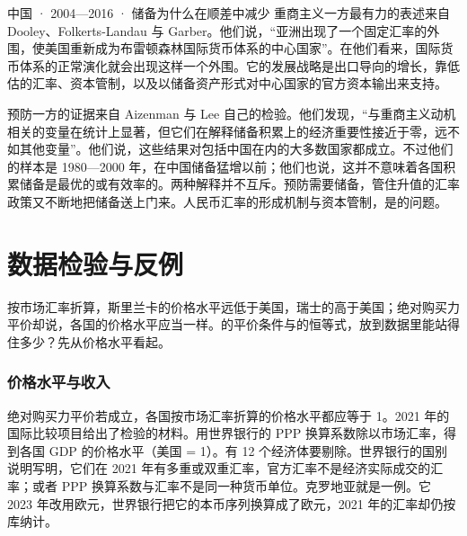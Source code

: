 \begin{case}{中国 · 2004—2016 · 储备为什么在顺差中减少}
重商主义一方最有力的表述来自 Dooley、Folkerts-Landau 与 Garber。他们说，“亚洲出现了一个固定汇率的外围，使美国重新成为布雷顿森林国际货币体系的中心国家”。在他们看来，国际货币体系的正常演化就会出现这样一个外围。它的发展战略是出口导向的增长，靠低估的汇率、资本管制，以及以储备资产形式对中心国家的官方资本输出来支持\cite{dooley2003}。

预防一方的证据来自 Aizenman 与 Lee 自己的检验。他们发现，“与重商主义动机相关的变量在统计上显著，但它们在解释储备积累上的经济重要性接近于零，远不如其他变量”。他们说，这些结果对包括中国在内的大多数国家都成立。不过他们的样本是 1980—2000 年，在中国储备猛增以前；他们也说，这并不意味着各国积累储备是最优的或有效率的\cite{aizenman2007}。两种解释并不互斥。预防需要储备，管住升值的汇率政策又不断地把储备送上门来。人民币汇率的形成机制与资本管制，是的问题。
\end{case}


\section{数据检验与反例}\label{sec:external-test}

按市场汇率折算，斯里兰卡的价格水平远低于美国，瑞士的高于美国；绝对购买力平价却说，各国的价格水平应当一样。的平价条件与的恒等式，放到数据里能站得住多少？先从价格水平看起。

\subsubsection{价格水平与收入}
绝对购买力平价若成立，各国按市场汇率折算的价格水平都应等于 1。2021 年的国际比较项目给出了检验的材料。用世界银行的 PPP 换算系数除以市场汇率，得到各国 GDP 的价格水平（美国 = 1）。有 12 个经济体要剔除。世界银行的国别说明写明，它们在 2021 年有多重或双重汇率，官方汇率不是经济实际成交的汇率；或者 PPP 换算系数与汇率不是同一种货币单位。克罗地亚就是一例。它 2023 年改用欧元，世界银行把它的本币序列换算成了欧元，2021 年的汇率却仍按库纳计\cite{wdi2026}。

